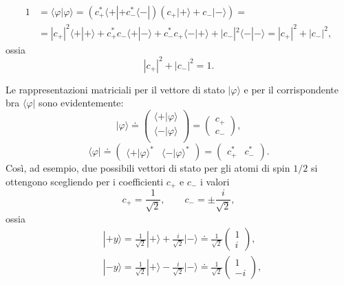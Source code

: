 \documentclass[a4paper,12pt,oneside]{book}
\begin{document}
	\begin{equation}
		\begin{aligned}
			1 & =\langle \varphi | \varphi \rangle = (c^*_+\langle + | +c^*_- \langle - |)(c_+| + \rangle +c_- | - \rangle)=\\
			&=| c_+|^2\langle + | + \rangle +c^*_+c_- \langle + | - \rangle +c^*_-c_+ \langle - | + \rangle +|c_-|^2 \langle - | - \rangle =|c_+|^2+|c_-|^2 ,
				\end{aligned} 
	\end{equation}
ossia 
	\begin{equation}
		\boxed{
			|c_+|^2+|c_-|^2=1 .
			}
	\end{equation}

Le rappresentazioni matriciali per il vettore di stato $| \varphi \rangle $ e per il corrispondente bra $\langle \varphi |$ sono evidentemente:
	\begin{equation}
 		\boxed{
 			| \varphi \rangle \doteq
			\begin{pmatrix}
			\langle + | \varphi \rangle\\
			\langle - | \varphi \rangle \\
			\end{pmatrix} = 
			\begin{pmatrix}
			c_+ \\
			c_-
			\end{pmatrix} ,
			}
	\end{equation}
	\begin{equation}
		\boxed{
			\langle \varphi | \doteq
			\begin{pmatrix}
			\langle + | \varphi \rangle ^* &
			\langle - | \varphi \rangle ^* 
			\end{pmatrix} = 
			\begin{pmatrix}
			c^*_+ & c^*_-
			\end{pmatrix} .
			}
	\end{equation}
Così, ad esempio, due possibili vettori di stato per gli atomi di spin $1/2$ si ottengono scegliendo per i coefficienti $c_+$ e $c_-$ i valori
	\begin{equation}
		c_+=\frac{1}{\sqrt{2}}, \qquad c_-=\pm \frac{i}{\sqrt{2}} ,
	\end{equation}
ossia
	\begin{equation}
		\boxed{
			\begin{aligned}
			&|+y \rangle = \frac{1}{\sqrt{2}}|+ \rangle +\frac{i}{\sqrt{2}}| - \rangle \doteq \frac{1}{\sqrt{2}}
			\begin{pmatrix}
			1 \\
			i
			\end{pmatrix} ,\\
			&| -y \rangle = \frac{1}{\sqrt{2}}| + \rangle -\frac{i}{\sqrt{2}}| - \rangle \doteq \frac{1}{\sqrt{2}}
			\begin{pmatrix}
			1 \\
			-i
			\end{pmatrix} ,
			\end{aligned} 
			}
	\label{cap3_15}
	\end{equation}
\end{document}
